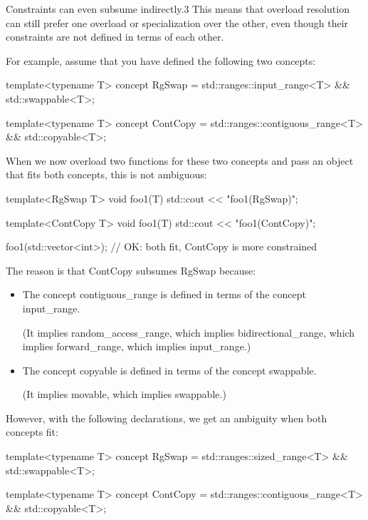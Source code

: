 
Constraints can even subsume indirectly.3 This means that overload resolution can still prefer one overload
or specialization over the other, even though their constraints are not defined in terms of each other.

For example, assume that you have defined the following two concepts:

\begin{cpp}
template<typename T>
concept RgSwap = std::ranges::input_range<T> && std::swappable<T>;

template<typename T>
concept ContCopy = std::ranges::contiguous_range<T> && std::copyable<T>;
\end{cpp}

When we now overload two functions for these two concepts and pass an object that fits both concepts, this is not ambiguous:

\begin{cpp}
template<RgSwap T>
void foo1(T) {
	std::cout << "foo1(RgSwap)\n";
}

template<ContCopy T>
void foo1(T) {
	std::cout << "foo1(ContCopy)\n";
}

foo1(std::vector<int>{}); // OK: both fit, ContCopy is more constrained
\end{cpp}

The reason is that ContCopy subsumes RgSwap because:

\begin{itemize}
\item
The concept contiguous\_range is defined in terms of the concept input\_range.

(It implies random\_access\_range, which implies bidirectional\_range, which implies forward\_range, which implies input\_range.)

\item
The concept copyable is defined in terms of the concept swappable.

(It implies movable, which implies swappable.)
\end{itemize}

However, with the following declarations, we get an ambiguity when both concepts fit:

\begin{cpp}
template<typename T>
concept RgSwap = std::ranges::sized_range<T> && std::swappable<T>;

template<typename T>
concept ContCopy = std::ranges::contiguous_range<T> && std::copyable<T>;
\end{cpp}


